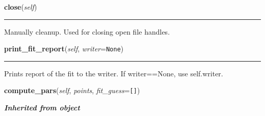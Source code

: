     \vspace{0.5ex}

\hspace{.8\funcindent}\begin{boxedminipage}{\funcwidth}

    \raggedright \textbf{close}(\textit{self})

    \vspace{-1.5ex}

    \rule{\textwidth}{0.5\fboxrule}
\setlength{\parskip}{2ex}
    Manually cleanup. Used for closing open file handles.

\setlength{\parskip}{1ex}
    \end{boxedminipage}

    \label{Tiling:Plane:print_fit_report}

    \vspace{0.5ex}

\hspace{.8\funcindent}\begin{boxedminipage}{\funcwidth}

    \raggedright \textbf{print\_fit\_report}(\textit{self}, \textit{writer}={\tt None})

    \vspace{-1.5ex}

    \rule{\textwidth}{0.5\fboxrule}
\setlength{\parskip}{2ex}
    Prints report of the fit to the writer. If writer==None, use 
    self.writer.

\setlength{\parskip}{1ex}
    \end{boxedminipage}

    \label{Tiling:Plane:compute_pars}

    \vspace{0.5ex}

\hspace{.8\funcindent}\begin{boxedminipage}{\funcwidth}

    \raggedright \textbf{compute\_pars}(\textit{self}, \textit{points}, \textit{fit\_guess}={\tt []})

\setlength{\parskip}{2ex}
\setlength{\parskip}{1ex}
    \end{boxedminipage}


\large{\textbf{\textit{Inherited from object}}}

